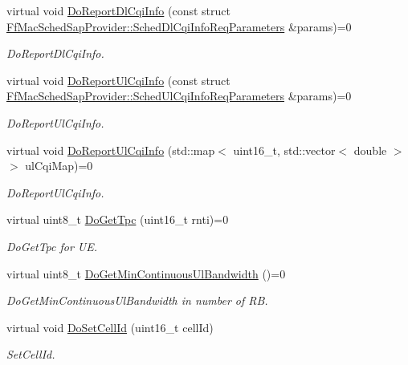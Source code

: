 \begin{DoxyCompactItemize}
virtual void \hyperlink{classns3_1_1LteFfrAlgorithm_ac831a30bc33fc77c7d3ec9b00bb5e5fe}{Do\+Report\+Dl\+Cqi\+Info} (const struct \hyperlink{structns3_1_1FfMacSchedSapProvider_1_1SchedDlCqiInfoReqParameters}{Ff\+Mac\+Sched\+Sap\+Provider\+::\+Sched\+Dl\+Cqi\+Info\+Req\+Parameters} \&params)=0
\begin{DoxyCompactList}\small\item\em Do\+Report\+Dl\+Cqi\+Info. \end{DoxyCompactList}\item 
virtual void \hyperlink{classns3_1_1LteFfrAlgorithm_a7047b2f2fbd76637bb5623fba4c73630}{Do\+Report\+Ul\+Cqi\+Info} (const struct \hyperlink{structns3_1_1FfMacSchedSapProvider_1_1SchedUlCqiInfoReqParameters}{Ff\+Mac\+Sched\+Sap\+Provider\+::\+Sched\+Ul\+Cqi\+Info\+Req\+Parameters} \&params)=0
\begin{DoxyCompactList}\small\item\em Do\+Report\+Ul\+Cqi\+Info. \end{DoxyCompactList}\item 
virtual void \hyperlink{classns3_1_1LteFfrAlgorithm_a9844380aae8883ac60bb3eb8cfe1e4e1}{Do\+Report\+Ul\+Cqi\+Info} (std\+::map$<$ uint16\+\_\+t, std\+::vector$<$ double $>$ $>$ ul\+Cqi\+Map)=0
\begin{DoxyCompactList}\small\item\em Do\+Report\+Ul\+Cqi\+Info. \end{DoxyCompactList}\item 
virtual uint8\+\_\+t \hyperlink{classns3_1_1LteFfrAlgorithm_a1c58dea37b4812fcb2a817e3e1c45343}{Do\+Get\+Tpc} (uint16\+\_\+t rnti)=0
\begin{DoxyCompactList}\small\item\em Do\+Get\+Tpc for UE. \end{DoxyCompactList}\item 
virtual uint8\+\_\+t \hyperlink{classns3_1_1LteFfrAlgorithm_a419e7a62dd16efa3d593d72e9495c724}{Do\+Get\+Min\+Continuous\+Ul\+Bandwidth} ()=0
\begin{DoxyCompactList}\small\item\em Do\+Get\+Min\+Continuous\+Ul\+Bandwidth in number of RB. \end{DoxyCompactList}\item 
virtual void \hyperlink{classns3_1_1LteFfrAlgorithm_a73b08184d2ac16c4d988417cf40793d4}{Do\+Set\+Cell\+Id} (uint16\+\_\+t cell\+Id)
\begin{DoxyCompactList}\small\item\em Set\+Cell\+Id. \end{DoxyCompactList}\item 

\end{DoxyCompactItemize}
